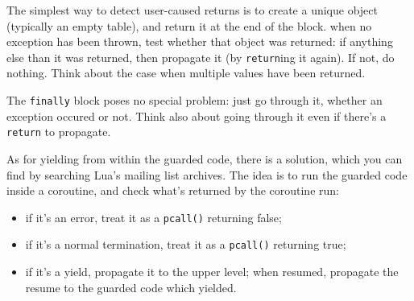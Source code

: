 The simplest way to detect user-caused returns is to create a unique
object (typically an empty table), and return it at the end of the
block. when no exception has been thrown, test whether that object was
returned: if anything else than it was returned, then propagate it (by
{\tt return}ing it again). If not, do nothing. Think about the case
when multiple values have been returned.

The {\tt finally} block poses no special problem: just go through it,
whether an exception occured or not. Think also about going through it
even if there's a {\tt return} to propagate.

As for yielding from within the guarded code, there is a solution,
which you can find by searching Lua's mailing list archives. The idea
is to run the guarded code inside a coroutine, and check what's
returned by the coroutine run:
\begin{itemize} 
\item if it's an error, treat it as a {\tt pcall()} returning false;
\item if it's a normal termination, treat it as a {\tt pcall()}
  returning true;
\item if it's a yield, propagate it to the upper level; when resumed,
  propagate the resume to the guarded code which yielded.
\end{itemize}